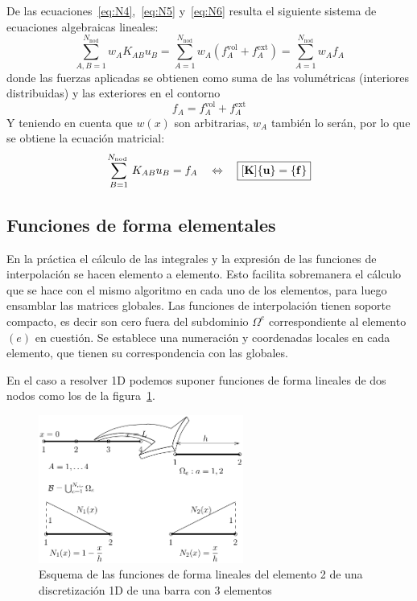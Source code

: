 \documentclass[spanish,a4paper,12pt]{article}
\begin{document}
De las ecuaciones~\eqref{eq:N4},~\eqref{eq:N5} y~\eqref{eq:N6} resulta el siguiente sistema de ecuaciones algebraicas lineales:
\begin{equation}\label{eq:N7}
\sum_{A, B=1}^{N_{\mathrm{nod}}} w_{A} K_{A B} u_{B}=\sum_{A=1}^{N_{\mathrm{nod}}} w_{A}\left(f_{A}^{\mathrm{vol}}+f_{A}^{\mathrm{ext}}\right)=\sum_{A=1}^{N_{\mathrm{nod}}} w_{A} f_{A}
\end{equation}
donde las fuerzas aplicadas se obtienen como suma de las
volumétricas (interiores distribuidas) y las exteriores en el contorno
$$
f_{A}=f_{A}^{\mathrm{vol}}+f_{A}^{\mathrm{ext}}
$$
Y teniendo en cuenta que $w(x)$ son arbitrarias, $w_{A}$ también lo
serán, por lo que se obtiene la ecuación matricial:
\begin{equation}\label{eq:N8}
\sum_{B=1}^{N_{\text {nod }}} K_{A B} u_{B}=f_{A} \quad \Leftrightarrow \quad \fbox{$\displaystyle [\mathbf{K}]\{\mathbf{u}\}=\{\mathbf{f}\}$}
\end{equation}

\subsection{Funciones de forma elementales}
\label{sec:N_e}
En la práctica el cálculo de las integrales y la expresión de las
funciones de interpolación se hacen elemento a elemento. Esto
facilita sobremanera el cálculo que se hace con el mismo
algoritmo en cada uno de los elementos, para luego ensamblar
las matrices globales. 
Las funciones de interpolación tienen soporte compacto, es
decir son cero fuera del subdominio $\Omega^{e}$ correspondiente al
elemento $(e)$ en cuestión.
Se establece una numeración y coordenadas locales en cada
elemento, que tienen su correspondencia con las globales. 

En el caso a resolver 1D podemos suponer funciones de forma lineales de dos nodos como los de la figura~\ref{fig:funciones_forma}. 

\begin{figure}[!htp]
\centering
% 
\includegraphics[width=0.6\textwidth]{figuras/func_forma1.pdf}
\caption{Esquema de las funciones de forma lineales del elemento 2 de una discretización 1D de una barra con 3 elementos}
\label{fig:funciones_forma}
\end{figure}
\end{document}
